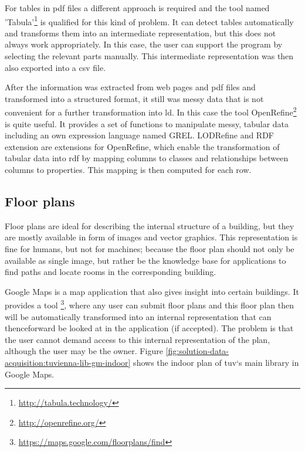 \documentclass[draft,final]{vutinfth} %
\begin{document}
For tables in \gls{pdf} files a different approach is required and the tool named 'Tabula'\footnote{\url{http://tabula.technology/}} is qualified for this kind of problem. It can detect tables automatically and transforms them into an intermediate representation, but this does not always work appropriately. In this case, the user can support the program by selecting the relevant parts manually. This intermediate representation was then also exported into a \gls{csv} file.

After the information was extracted from web pages and \gls{pdf} files and transformed into a structured format, it still was messy data that is not convenient for a further transformation into \gls{ld}. In this case the tool OpenRefine\footnote{\url{http://openrefine.org/}} is quite useful. It provides a set of functions to manipulate messy, tabular data including an own expression language named GREL. LODRefine and RDF extension are extensions for OpenRefine, which enable the transformation of tabular data into \gls{rdf} by mapping columns to classes and relationships between columns to properties. This mapping is then computed for each row. 

\subsection{Floor plans}
\label{solution-data-acquisition-floor-plans}
Floor plans are ideal for describing the internal structure of a building, but they are mostly available in form of images and vector graphics. This representation is fine for humans, but not for machines; because the floor plan should not only be available as single image, but rather be the knowledge base for applications to find paths and locate rooms in the corresponding building.

Google Maps is a map application that also gives insight into certain buildings. It provides a tool \footnote{\url{https://maps.google.com/floorplans/find}}, where any user can submit floor plans and this floor plan then will be automatically transformed into an internal representation that can thenceforward be looked at in the application (if accepted). The problem is that the user cannot demand access to this internal representation of the plan, although the user may be the owner. Figure \ref{fig:solution-data-acquisition:tuvienna-lib-gm-indoor} shows the indoor plan of \gls{tuv}`s main library in Google Maps.
\end{document}
